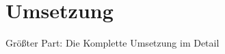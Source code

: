 




















\section{Umsetzung}\label{Umsetzung}
Größter Part: Die Komplette Umsetzung im Detail

%   
%
%

